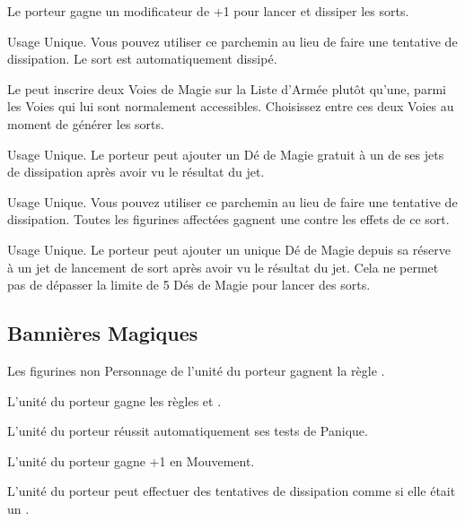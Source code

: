 \startpricelist

Le porteur gagne un modificateur de +1 pour lancer et dissiper les sorts.

Usage Unique. Vous pouvez utiliser ce parchemin au lieu de faire une tentative de dissipation. Le sort est automatiquement dissipé.

Le \wizard{} peut inscrire deux Voies de Magie sur la Liste d'Armée plutôt qu'une, parmi les Voies qui lui sont normalement accessibles. Choisissez entre ces deux Voies au moment de générer les sorts.

Usage Unique. Le porteur peut ajouter un Dé de Magie gratuit à un de ses jets de dissipation après avoir vu le résultat du jet.

\columnbreak

Usage Unique. Vous pouvez utiliser ce parchemin au lieu de faire une tentative de dissipation. Toutes les figurines affectées gagnent une  contre les effets de ce sort.

Usage Unique. Le porteur peut ajouter un unique Dé de Magie depuis sa réserve à un jet de lancement de sort après avoir vu le résultat du jet. Cela ne permet pas de dépasser la limite de 5 Dés de Magie pour lancer des sorts.

\endpricelist

\newpage
\hypertarget{magicalstandards}{\subsection{Bannières Magiques}}
\label{magical_standards}

\startpricelist

Les figurines non Personnage de l'unité du porteur gagnent la règle .

L'unité du porteur gagne les règles \swiftstride{} et \strider{}.

L'unité du porteur réussit automatiquement ses tests de Panique.

L'unité du porteur gagne +1 en Mouvement.

L'unité du porteur peut effectuer des tentatives de dissipation comme si elle était un \wizardmaster{}.

